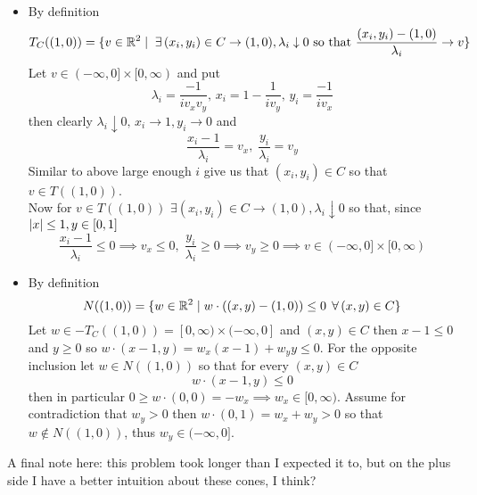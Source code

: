 \documentclass{article}
\newenvironment{ex}[1]
  {\renewcommand\theexercise{#1}\exercise}
  {\endexercise}
\newcommand{\R}[1]{\mathbb{R}^{#1}}
\begin{document}
\begin{ex}{7.9}
\begin{itemize}
      $$
      w \cdot ((x, y) - (0, 1)) = w_y \cdot (y - 1) \le 0 \implies w \in N((0, 1))
      $$
      For the reverse inclusion notice $(0, 0) \in C$ so that for $w \in N((0, 1))$
      $$
      0 \ge w \cdot ((0, 0) - (0, 1)) = - w_y \implies w_y \ge 0
      $$
      Suppose for contradiction $w_x \ne 0$ and w.l.o.g. $w_x > 0$ (symmetry allows us this). Consider $x < \frac{w_x}{w_y}$ then
      $$
      \frac{w_y}{w_x} < \frac{1}{x} = \frac{x}{x^2} < \frac{x}{1 - \sqrt{1-x^2}} \implies w_y \parens{1 - \sqrt{1-x^2}} < w_x x \implies 0 < w \cdot ((x, \sqrt{1-x^2}) - (0, 1)) \implies w \not\in N((0, 1))
      $$
      so that $w_x = 0$ and thus $N((0, 1)) \subset \braces{0} \times [0, \infty)$
    \item
      By definition
      $$
      T_C((1, 0)) = \braces{ v \in \R{2} \mid \exists (x_i, y_i) \in C \to (1, 0), \lambda_i \downarrow 0 \text{ so that } \frac{(x_i, y_i) - (1, 0)}{\lambda_i} \to v }
      $$
      Let $v \in (-\infty, 0] \times [0, \infty)$ and put
      $$
      \lambda_i = \frac{-1}{iv_x v_y}, \, x_i = 1- \frac{1}{i v_y}, \, y_i = \frac{-1}{i v_x}
      $$
      then clearly $\lambda_i \downarrow 0, \, x_i \to 1, y_i \to 0$ and
      $$
      \frac{x_i - 1}{\lambda_i} = v_x, \; \frac{y_i}{\lambda_i} = v_y
      $$
      Similar to above large enough $i$ give us that $(x_i, y_i) \in C$ so that $v \in T((1, 0))$. \, \\

      Now for $v \in T((1, 0))$ $\exists (x_i, y_i) \in C \to (1, 0), \lambda_i \downarrow 0$ so that, since $\lvert x\rvert \le 1, y \in [0, 1]$
      $$
      \frac{x_i - 1}{\lambda_i} \le 0 \implies v_x \le 0, \; \frac{y_i}{\lambda_i} \ge 0 \implies v_y \ge 0 \implies v \in (-\infty, 0] \times [0, \infty)
      $$
    \item
      By definition
      $$
      N((1, 0)) = \braces{ w \in \R{2} \mid w \cdot ((x, y) - (1, 0)) \le 0 \, \forall (x, y) \in C }
      $$
      Let $w \in -T_C((1, 0)) = [0, \infty) \times (-\infty, 0]$ and $(x, y) \in C$ then $x - 1 \le 0$ and $y \ge 0$ so $w \cdot (x-1, y) = w_x (x - 1) + w_y y \le 0$. For the opposite inclusion let $w \in N((1, 0))$ so that for every $(x, y) \in C$
      $$
      w \cdot (x-1, y) \le 0
      $$
      then in particular $0 \ge w \cdot (0, 0) = -w_x \implies w_x \in [0, \infty)$. Assume for contradiction that $w_y > 0$ then $w \cdot (0, 1) = w_x + w_y > 0$ so that $w \not\in N((1, 0))$, thus $w_y \in (-\infty, 0]$.
  \end{itemize}
  A final note here: this problem took longer than I expected it to, but on the plus side I have a better intuition about these cones, I think?
\end{ex} %
\end{document}
